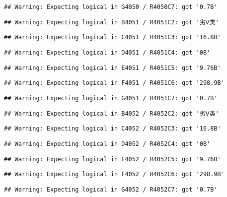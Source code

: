 \documentclass[
]{article}
\begin{document}
\begin{verbatim}
## Warning: Expecting logical in G4050 / R4050C7: got '0.7B'
\end{verbatim}

\begin{verbatim}
## Warning: Expecting logical in B4051 / R4051C2: got '劣Ⅴ类'
\end{verbatim}

\begin{verbatim}
## Warning: Expecting logical in C4051 / R4051C3: got '16.8B'
\end{verbatim}

\begin{verbatim}
## Warning: Expecting logical in D4051 / R4051C4: got '0B'
\end{verbatim}

\begin{verbatim}
## Warning: Expecting logical in E4051 / R4051C5: got '9.76B'
\end{verbatim}

\begin{verbatim}
## Warning: Expecting logical in F4051 / R4051C6: got '298.9B'
\end{verbatim}

\begin{verbatim}
## Warning: Expecting logical in G4051 / R4051C7: got '0.7B'
\end{verbatim}

\begin{verbatim}
## Warning: Expecting logical in B4052 / R4052C2: got '劣Ⅴ类'
\end{verbatim}

\begin{verbatim}
## Warning: Expecting logical in C4052 / R4052C3: got '16.8B'
\end{verbatim}

\begin{verbatim}
## Warning: Expecting logical in D4052 / R4052C4: got '0B'
\end{verbatim}

\begin{verbatim}
## Warning: Expecting logical in E4052 / R4052C5: got '9.76B'
\end{verbatim}

\begin{verbatim}
## Warning: Expecting logical in F4052 / R4052C6: got '298.9B'
\end{verbatim}

\begin{verbatim}
## Warning: Expecting logical in G4052 / R4052C7: got '0.7B'
\end{verbatim}
\end{document}
